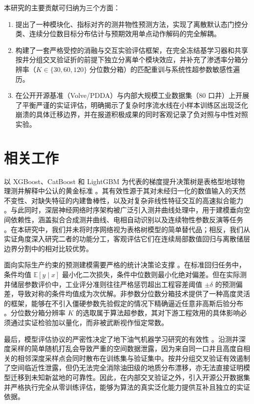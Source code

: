 \documentclass[preprint,12pt,nopreprintline]{elsarticle}
\begin{document}
本研究的主要贡献可归纳为三个方面：
\begin{enumerate}
\item 提出了一种模块化、指标对齐的测井物性预测方法，实现了离散默认态门控分类、连续分位数目标分布估计与预期效用单点动作解码的完全解耦。
\item 构建了一套严格受控的消融与交互实验评估框架，在完全冻结基学习器和共享按井分组交叉验证折的前提下独立分离单个模块效应，并补充了渗透率分箱分辨率（$K \in \{30, 60, 120\}$ 分位数分箱）的匹配重训与系统性超参数敏感性遍历。
\item 在公开开源基准（Volve/PDDA）与内部大规模工业数据集（80 口井）上开展了平衡严谨的实证评估，明确揭示了复杂时序流水线在小样本训练区出现泛化崩溃的具体迁移边界，并在报道积极成果的同时客观记录了负对照与中性对照实验。
\end{enumerate}

\section{相关工作}
\label{sec:related}
以 XGBoost、CatBoost 和 LightGBM 为代表的梯度提升决策树是表格型地球物理测井解释中公认的黄金标准 \cite{ke2017lightgbm,prokhorenkova2018catboost}。其有效性源于其对未经归一化的数值输入的天然不变性、对缺失特征的内建鲁棒性，以及对复杂非线性特征交互的高速拟合能力 \cite{anifowose2017,almudhafar2019}。与此同时，深层神经网络时序架构被广泛引入测井曲线处理中，用于建模垂向空间依赖性，涵盖拟合合成测井曲线、电相自动识别以及连续物性参数反演等任务 \cite{zhang2018synthetic,wang2020deep,song2021geological}。在本研究中，我们并未将时序网络视为表格树模型的简单替代品；相反，我们从实证角度深入研究二者的功能分工，客观评估它们在连续局部数值回归与离散储层边界分割中的相对比较优势。

面向实际生产约束的预测建模需要严格的统计决策论支撑 \cite{berger1985,bishop2006,gneiting2007}。在标准回归任务中，条件均值 $\mathbb{E}[y \mid x]$ 最小化二次损失，条件中位数则最小化绝对偏差。但在实际测井储层参数评价中，工业评分准则往往严格惩罚超出工程容差阈值 $\pm \delta$ 的预测偏差，导致对称的条件均值成为次优解。非参数分位数分箱技术提供了一种高度灵活的框架，能够在不引入僵硬参数先验假定的情况下精确逼近任意非高斯后验分布 \cite{gneiting2007}。分位数分箱分辨率 $K$ 的选取属于算法超参数，其对下游工程效用的具体影响必须通过实证检验加以量化，而非被武断视作恒定常数。

最后，模型评估协议的严密性决定了地下油气机器学习研究的有效性 \cite{pan2010survey,phoon2024trustworthy}。沿测井深度采样的简单随机打乱会导致严重的空间数据泄露，因为来自同一口井且高度自相关的相邻深度采样点会同时散布在训练集与验证集中。按井分组交叉验证有效遏制了空间临近性泄露，但仍无法完全消除油田级的地质分布漂移，亦无法直接证明模型迁移到未知新盆地的可靠性。因此，在内部交叉验证之外，引入开源公开数据集并严格执行完全从零训练评估，能够为算法的真实泛化能力提供互补且独立的实证依据。
\end{document}
